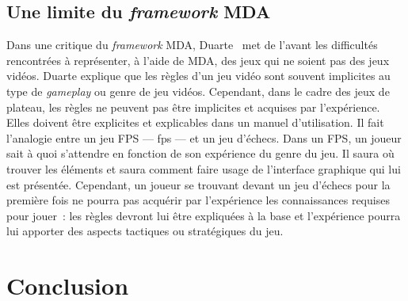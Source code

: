 \subsection{Une limite du \emph{framework} MDA}
Dans une critique du \emph{framework} MDA, Duarte~\cite{GAMA_MDA} met de l'avant les difficultés  rencontr\'ees à représenter, \`a l'aide de MDA, des jeux qui ne soient pas des jeux vidéos. 
Duarte explique que les règles d'un jeu vidéo sont souvent implicites au type de \emph{gameplay} ou genre de jeu vidéos. 
Cependant, dans le cadre des jeux de plateau, les règles ne peuvent pas être implicites et acquises par l'expérience. 
Elles doivent être explicites et explicables dans un manuel d'utilisation. 
Il fait l'analogie entre un jeu FPS --- \gls{fps} --- et un jeu d'échecs. Dans un FPS, un joueur sait à quoi s'attendre en fonction de son expérience du genre du jeu. 
Il saura o\`u trouver les éléments et saura comment faire usage de l'interface graphique qui lui est présentée. 
Cependant, un joueur se trouvant devant un jeu d'échecs pour la première fois ne pourra pas acquérir par l'exp\'erience les connaissances requises pour jouer~: les règles devront lui être expliquées à la base et l'expérience pourra lui apporter des aspects tactiques ou strat\'egiques du jeu.

\section{Conclusion}
